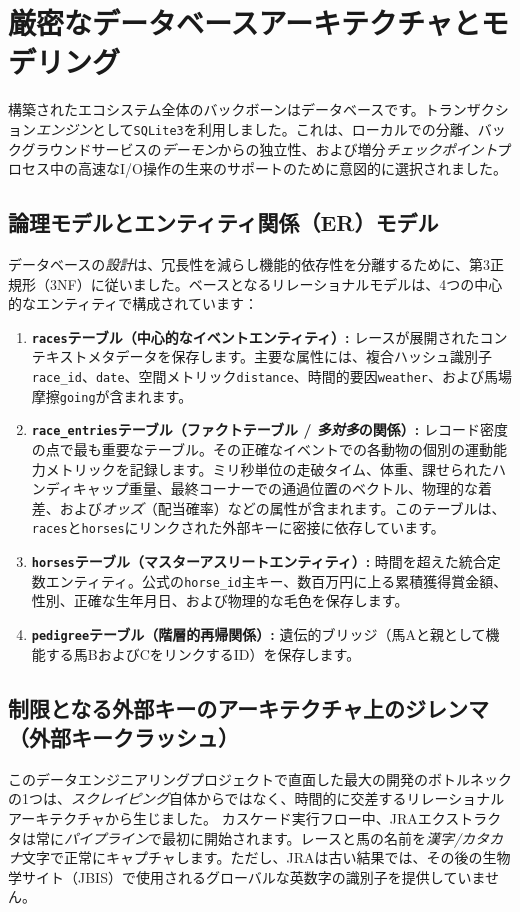 \documentclass[12pt,a4paper]{article}
\begin{document}
\section{厳密なデータベースアーキテクチャとモデリング}
構築されたエコシステム全体のバックボーンはデータベースです。トランザクション\textit{エンジン}として\texttt{SQLite3}を利用しました。これは、ローカルでの分離、バックグラウンドサービスの\textit{デーモン}からの独立性、および増分\textit{チェックポイント}プロセス中の高速なI/O操作の生来のサポートのために意図的に選択されました。

\subsection{論理モデルとエンティティ関係（ER）モデル}
データベースの\textit{設計}は、冗長性を減らし機能的依存性を分離するために、第3正規形（3NF）に従いました。ベースとなるリレーショナルモデルは、4つの中心的なエンティティで構成されています：
\begin{enumerate}
    \item \textbf{\texttt{races}テーブル（中心的なイベントエンティティ）:}
    レースが展開されたコンテキストメタデータを保存します。主要な属性には、複合ハッシュ識別子\texttt{race\_id}、\texttt{date}、空間メトリック\texttt{distance}、時間的要因\texttt{weather}、および馬場摩擦\texttt{going}が含まれます。
    \item \textbf{\texttt{race\_entries}テーブル（ファクトテーブル / \textit{多対多}の関係）:}
    レコード密度の点で最も重要なテーブル。その正確なイベントでの各動物の個別の運動能力メトリックを記録します。ミリ秒単位の走破タイム、体重、課せられたハンディキャップ重量、最終コーナーでの通過位置のベクトル、物理的な着差、および\textit{オッズ}（配当確率）などの属性が含まれます。このテーブルは、\texttt{races}と\texttt{horses}にリンクされた外部キーに密接に依存しています。
    \item \textbf{\texttt{horses}テーブル（マスターアスリートエンティティ）:}
    時間を超えた統合定数エンティティ。公式の\texttt{horse\_id}主キー、数百万円に上る累積獲得賞金額、性別、正確な生年月日、および物理的な毛色を保存します。
    \item \textbf{\texttt{pedigree}テーブル（階層的再帰関係）:}
    遺伝的ブリッジ（馬Aと親として機能する馬BおよびCをリンクするID）を保存します。
\end{enumerate}

\subsection{制限となる外部キーのアーキテクチャ上のジレンマ（外部キークラッシュ）}
このデータエンジニアリングプロジェクトで直面した最大の開発のボトルネックの1つは、\textit{スクレイピング}自体からではなく、時間的に交差するリレーショナルアーキテクチャから生じました。
カスケード実行フロー中、JRAエクストラクタは常に\textit{パイプライン}で最初に開始されます。レースと馬の名前を\textit{漢字/カタカナ}文字で正常にキャプチャします。ただし、JRAは古い結果では、その後の生物学サイト（JBIS）で使用されるグローバルな英数字の識別子を提供していません。
\end{document}
